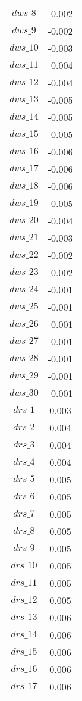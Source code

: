 \begin{center}
\begin{longtable}{cc}
$dws\_8$ 	 & 	 -0.002 \\
$dws\_9$ 	 & 	 -0.002 \\
$dws\_10$ 	 & 	 -0.003 \\
$dws\_11$ 	 & 	 -0.004 \\
$dws\_12$ 	 & 	 -0.004 \\
$dws\_13$ 	 & 	 -0.005 \\
$dws\_14$ 	 & 	 -0.005 \\
$dws\_15$ 	 & 	 -0.005 \\
$dws\_16$ 	 & 	 -0.006 \\
$dws\_17$ 	 & 	 -0.006 \\
$dws\_18$ 	 & 	 -0.006 \\
$dws\_19$ 	 & 	 -0.005 \\
$dws\_20$ 	 & 	 -0.004 \\
$dws\_21$ 	 & 	 -0.003 \\
$dws\_22$ 	 & 	 -0.002 \\
$dws\_23$ 	 & 	 -0.002 \\
$dws\_24$ 	 & 	 -0.001 \\
$dws\_25$ 	 & 	 -0.001 \\
$dws\_26$ 	 & 	 -0.001 \\
$dws\_27$ 	 & 	 -0.001 \\
$dws\_28$ 	 & 	 -0.001 \\
$dws\_29$ 	 & 	 -0.001 \\
$dws\_30$ 	 & 	 -0.001 \\
$drs\_1$ 	 & 	 0.003 \\
$drs\_2$ 	 & 	 0.004 \\
$drs\_3$ 	 & 	 0.004 \\
$drs\_4$ 	 & 	 0.004 \\
$drs\_5$ 	 & 	 0.005 \\
$drs\_6$ 	 & 	 0.005 \\
$drs\_7$ 	 & 	 0.005 \\
$drs\_8$ 	 & 	 0.005 \\
$drs\_9$ 	 & 	 0.005 \\
$drs\_10$ 	 & 	 0.005 \\
$drs\_11$ 	 & 	 0.005 \\
$drs\_12$ 	 & 	 0.005 \\
$drs\_13$ 	 & 	 0.006 \\
$drs\_14$ 	 & 	 0.006 \\
$drs\_15$ 	 & 	 0.006 \\
$drs\_16$ 	 & 	 0.006 \\
$drs\_17$ 	 & 	 0.006 \\

\end{longtable}
\end{center}
